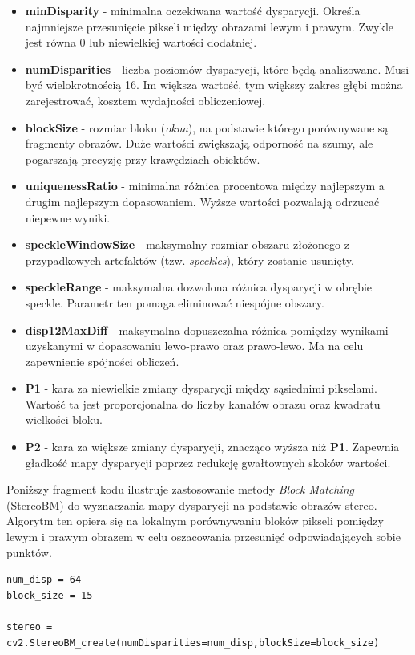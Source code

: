 \documentclass[magisterska]{pracadypl}
\begin{document}
\begin{itemize}
    \item \textbf{minDisparity} - minimalna oczekiwana wartość dysparycji. Określa najmniejsze przesunięcie pikseli między obrazami lewym i prawym. Zwykle jest równa 0 lub niewielkiej wartości dodatniej.
    \item \textbf{numDisparities} - liczba poziomów dysparycji, które będą analizowane. Musi być wielokrotnością 16. Im większa wartość, tym większy zakres głębi można zarejestrować, kosztem wydajności obliczeniowej.
    \item \textbf{blockSize} - rozmiar bloku (\textit{okna}), na podstawie którego porównywane są fragmenty obrazów. Duże wartości zwiększają odporność na szumy, ale pogarszają precyzję przy krawędziach obiektów.
    \item \textbf{uniquenessRatio} - minimalna różnica procentowa między najlepszym a drugim najlepszym dopasowaniem. Wyższe wartości pozwalają odrzucać niepewne wyniki.
    \item \textbf{speckleWindowSize} - maksymalny rozmiar obszaru złożonego z przypadkowych artefaktów (tzw. \textit{speckles}), który zostanie usunięty.
    \item \textbf{speckleRange} - maksymalna dozwolona różnica dysparycji w obrębie speckle. Parametr ten pomaga eliminować niespójne obszary.
    \item \textbf{disp12MaxDiff} - maksymalna dopuszczalna różnica pomiędzy wynikami uzyskanymi w dopasowaniu lewo-prawo oraz prawo-lewo. Ma na celu zapewnienie spójności obliczeń.
    \item \textbf{P1} - kara za niewielkie zmiany dysparycji między sąsiednimi pikselami. Wartość ta jest proporcjonalna do liczby kanałów obrazu oraz kwadratu wielkości bloku.
    \item \textbf{P2} - kara za większe zmiany dysparycji, znacząco wyższa niż \textbf{P1}. Zapewnia gładkość mapy dysparycji poprzez redukcję gwałtownych skoków wartości.
\end{itemize}

Poniższy fragment kodu ilustruje zastosowanie metody \textit{Block Matching} (StereoBM) do wyznaczania mapy dysparycji na podstawie obrazów stereo. Algorytm ten opiera się na lokalnym porównywaniu bloków pikseli pomiędzy lewym i prawym obrazem w celu oszacowania przesunięć odpowiadających sobie punktów.  

\begin{lstlisting}[style=mypython]
num_disp = 64 
block_size = 15 

stereo = cv2.StereoBM_create(numDisparities=num_disp,blockSize=block_size)
\end{lstlisting}
\end{document}
